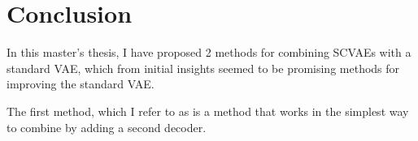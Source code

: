 \chapter{Conclusion}

In this master's thesis, I have proposed 2 methods for combining SCVAEs with a standard VAE, which from initial insights seemed to be promising methods for improving the standard VAE.


The first method, which I refer to as  is a method that works in the simplest way to combine by adding a second decoder. 